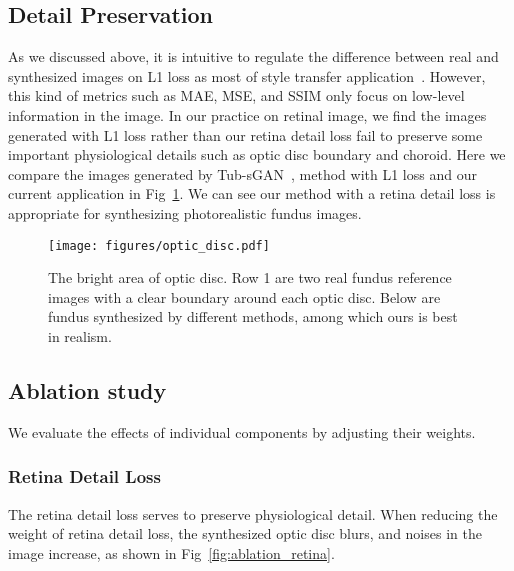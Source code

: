 \documentclass[letterpaper]{article} %
\begin{document}
    \subsection{Detail Preservation}
    \label{sec:exp_detail}
    
    As we discussed above, it is intuitive to regulate the difference between real and synthesized images on L1 loss as most of style transfer application~\cite{DBLP:conf/cvpr/GatysEB16}. However, this kind of metrics such as MAE, MSE, and SSIM only focus on low-level information in the image. In our practice on retinal image, we find the images generated with L1 loss rather than our retina detail loss fail to preserve some important physiological details such as optic disc boundary and choroid. Here we compare the images generated by Tub-sGAN~\cite{zhao2018synthesizing}, method with L1  loss and our current application in Fig~\ref{fig:optic_disc}.   We can see our method with a retina detail loss is appropriate for synthesizing photorealistic fundus images.
    
	\begin{figure}[h!]
		\begin{center}
			\texttt{[image: figures/optic\_disc.pdf]}
		\end{center}
		\caption{The bright area of optic disc. Row 1 are two real fundus reference images with a clear boundary around each optic disc. Below are fundus synthesized by different methods, among which ours is best in realism. }
		\label{fig:optic_disc}
	\end{figure}
	
	\subsection{Ablation study}
	
    We evaluate the effects of individual components by adjusting their weights. 
    
	
    \subsubsection{Retina Detail Loss}
    
	The retina detail loss serves to preserve physiological detail. When reducing the weight of retina detail loss, the synthesized optic disc blurs, and noises in the image increase, as shown in Fig~\ref{fig:ablation_retina}.
    
\end{document}
